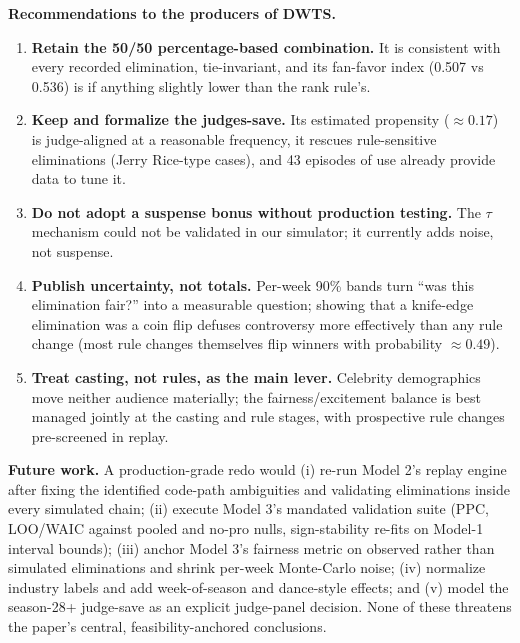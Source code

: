 \documentclass[11pt]{article}
\begin{document}
\textbf{Recommendations to the producers of DWTS.}
\begin{enumerate}[itemsep=1pt]
  \item \textbf{Retain the 50/50 percentage-based combination.} It is consistent with
        every recorded elimination, tie-invariant, and its fan-favor index
        (0.507 vs 0.536) is if anything slightly lower than the rank rule's.
  \item \textbf{Keep and formalize the judges-save.} Its estimated propensity
        ($\approx 0.17$) is judge-aligned at a reasonable frequency, it rescues
        rule-sensitive eliminations (Jerry Rice-type cases), and 43 episodes of use
        already provide data to tune it.
  \item \textbf{Do not adopt a suspense bonus without production testing.} The
        $\tau$ mechanism could not be validated in our simulator; it currently adds
        noise, not suspense.
  \item \textbf{Publish uncertainty, not totals.} Per-week 90\% bands turn ``was this
        elimination fair?'' into a measurable question; showing that a knife-edge
        elimination was a coin flip defuses controversy more effectively than any rule
        change (most rule changes themselves flip winners with probability
        $\approx 0.49$).
  \item \textbf{Treat casting, not rules, as the main lever.} Celebrity demographics
        move neither audience materially; the fairness/excitement balance is best
        managed jointly at the casting and rule stages, with prospective rule changes
        pre-screened in replay.
\end{enumerate}

\textbf{Future work.} A production-grade redo would (i) re-run Model 2's replay engine
after fixing the identified code-path ambiguities and validating eliminations inside
every simulated chain; (ii) execute Model 3's mandated validation suite (PPC, LOO/WAIC
against pooled and no-pro nulls, sign-stability re-fits on Model-1 interval bounds);
(iii) anchor Model 3's fairness metric on observed rather than simulated eliminations
and shrink per-week Monte-Carlo noise; (iv) normalize industry labels and add
week-of-season and dance-style effects; and (v) model the season-28+ judge-save as an
explicit judge-panel decision. None of these threatens the paper's central,
feasibility-anchored conclusions.

\newpage
\end{document}

